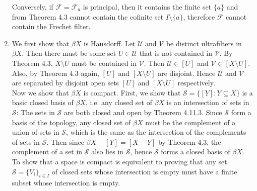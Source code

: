 \documentclass{article}
\begin{document}
\begin{enumerate}
    Conversely, if $\mathcal{F}=\mathcal{F}_a$ is principal, then it
    contains the finite set $\{a\}$ and from Theorem 4.3 cannot contain the
    cofinite set $I\setminus\{a\}$, therefore $\mathcal{F}$ cannot contain
    the Frechet filter.

  \item We first show that $\beta X$ is Hausdorff. Let $\mathcal{U}$ and
    $\mathcal{V}$ be distinct ultrafilters in $\beta X$. Then there must be
    some set $U\in\mathcal{U}$ that is not contained in $\mathcal{V}$. By
    Theorem 4.3, $X\setminus U$ must be contained in $\mathcal{V}$. Then
    $\mathcal{U}\in[U]$ and $\mathcal{V}\in[X\setminus U]$. Also, by
    Theorem 4.3 again, $[U]$ and $[X\setminus U]$ are disjoint. Hence
    $\mathcal{U}$ and $\mathcal{V}$ are separated by disjoint open sets
    $[U]$ and $[X\setminus U]$ respectively. \\

    Now we show that $\beta X$ is compact. First, we show that
    $\mathcal{S}=\{[Y]:Y\subseteq X\}$ is a basic closed basis of $\beta
    X$, i.e. any closed set of $\beta X$ is an intersection of sets in
    $\mathcal{S}$: The sets in $\mathcal{S}$ are both closed and open by
    Theorem 4.11.3. Since $\mathcal{S}$ form a basis of the topology, any
    closed set of $\beta X$ must be the complement of a union of sets in
    $\mathcal{S}$, which is the same as the intersection of the complements
    of sets in $\mathcal{S}$. Then since $\beta X-[Y]=[X-Y]$ by Theorem
    4.3, the complement of a set in $\mathcal{S}$ also lies in
    $\mathcal{S}$, hence $\mathcal{S}$ forms a closed basis of $\beta X$.
    \\

    To show that a space is compact is equivalent to proving that any set
    $\mathcal{S}=\{V_i\}_{i\in I}$ of closed sets whose intersection is
    empty must have a finite subset whose intersection is empty.
\end{enumerate}
\end{document}
